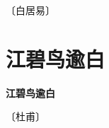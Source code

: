 \documentclass[12pt,UTF-8,openany,fontset=none]{ctexbook}
\begin{document}
\begin{center}
    \vspace{10pt}
    
    \begin{large}
        
        〔白居易〕
        
    \end{large}
    
    \vspace{8pt}
    
    \begin{huge}
        
        \phantom{。}

        \phantom{。}
        
        \phantom{。}

        \phantom{。}
        
    \end{huge}
    
\end{center}

\vspace{8pt}
\clearpage


\section{江碧鸟逾白}



\begin{center}
    {\bfseries 江碧鸟逾白}
\end{center}

\begin{center}
    \vspace{10pt}
    
    \begin{large}
        
        〔杜甫〕
        
    \end{large}
    
    \vspace{8pt}
    
    \begin{huge}
        
        \phantom{。}

        \phantom{。}
        
        \phantom{。}

        \phantom{。}
        
    \end{huge}
    
\end{center}
\end{document}
